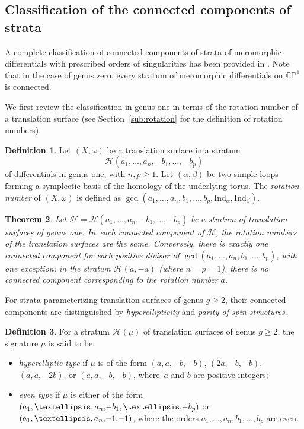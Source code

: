 \documentclass[11pt]{article}
\newtheorem{thm}{Theorem}[section]
\theoremstyle{definition}
\newtheorem{defn}[thm]{Definition}
\begin{document}
\subsection{Classification of the connected components of strata}\label{sub:CCClassification}

A complete classification of connected components of strata of meromorphic differentials with prescribed orders of singularities has been provided in \cite{Bo}. Note that in the case of genus zero, every stratum of meromorphic differentials on $\mathbb C\mathbb P^1$ is connected.

We first review the classification in genus one in terms of the rotation number of a translation surface (see Section~\ref{sub:rotation} for the definition of rotation numbers).

\begin{defn}
Let $(X,\omega)$ be a translation surface in a stratum
\[
\mathcal{H}(a_{1},\dots,a_{n},-b_{1},\dots,-b_{p})
\]
of differentials in genus one, with $n,p \geq 1$. Let $(\alpha,\beta)$ be two simple loops forming a symplectic basis of the homology of the underlying torus. The \textit{rotation number} of $(X,\omega)$ is defined as $\gcd(a_{1},\dots,a_{n},b_{1},\dots,b_{p},\mathrm{Ind}_{\alpha},\mathrm{Ind}_{\beta})$.
\end{defn}

\begin{thm}\label{thm:BoissyGenusOne}
Let $\mathcal{H}=\mathcal{H}(a_{1},\dots,a_{n},-b_{1},\dots,-b_{p})$ be a stratum of translation surfaces of genus one. In~each connected component of $\mathcal{H}$, the rotation numbers of the translation surfaces are the same. Conversely, there is exactly one connected component for each positive divisor of $\gcd(a_{1},\dots,a_{n},b_{1},\dots,b_{p})$, with one exception: in the stratum $\mathcal{H}(a,-a)$ (where $n=p=1$), there is no connected component corresponding to the rotation number $a$.
\end{thm}

For strata parameterizing translation surfaces of genus $g \geq 2$, their connected components are distinguished by \textit{hyperellipticity} and \textit{parity of spin structures}.

\begin{defn}
For a stratum $\mathcal{H}(\mu)$ of translation surfaces of genus $g \geq 2$, the signature $\mu$ is said to be:
\begin{itemize}
\item \textit{hyperelliptic type} if $\mu$ is of the form $(a,a,-b,-b)$, $(2a,-b,-b)$, $(a,a,-2b)$, or $(a,a,-b,-b)$, where~$a$ and $b$ are positive integers;
\item \textit{even type} if $\mu$ is either of the form $(a_{1},\dots,a_{n},\mkern-3mu -b_{1},\dots,\mkern-3mu -b_{p})$ or $(a_{1},\dots,a_{n},\mkern-3mu-1,\mkern-3mu -1)$, where the orders $a_{1},\dots,a_{n},b_{1},\dots,b_{p}$ are even.
\end{itemize}
\end{defn}
\end{document}
